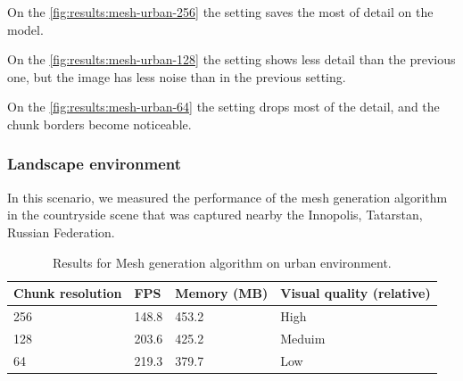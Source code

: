 On the \autoref{fig:results:mesh-urban-256} the setting saves the most of detail on the model.

On the \autoref{fig:results:mesh-urban-128} the setting shows less detail than the previous one, but the image has less noise than in the previous setting.

On the \autoref{fig:results:mesh-urban-64} the setting drops most of the detail, and the chunk borders become noticeable.


\subsubsection{Landscape environment}

In this scenario, we measured the performance of the mesh generation algorithm in the countryside scene that was captured nearby the Innopolis, Tatarstan, Russian Federation.

\begin{table}[htb]
    \centering
    \begin{tabular}{l|l|l|l}
    Chunk resolution & FPS & Memory (MB) & Visual quality (relative) \\ \hline
    256 & 148.8 & 453.2 & High \\
    128 & 203.6 & 425.2 & Meduim \\
    64 & 219.3 & 379.7 & Low
    \end{tabular}
    
    \caption{Results for Mesh generation algorithm on urban environment.}
    \label{tab:results:mesh-landscape}
\end{table}

